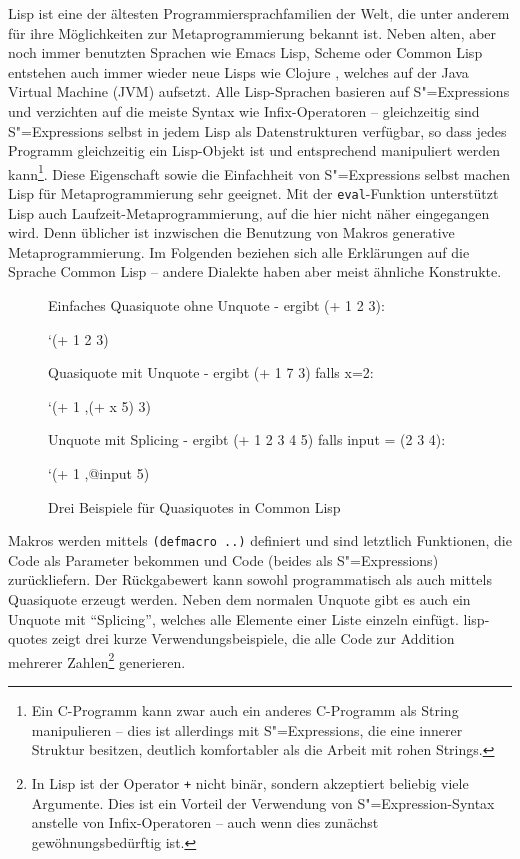 \documentclass[12pt, a4paper, bibgerm]{scrbook}
\newenvironment{DIFnomarkup}{}{}
\newcommand\icode[1]{\lstinline?#1?}
\newcommand\abb{}
\newcommand{\sexp}{S"=Expression}
\newcommand{\sexps}{S"=Expressions}
\begin{document}
Lisp ist eine der ältesten Programmiersprachfamilien der Welt, die unter
anderem für ihre Möglichkeiten zur Metaprogrammierung bekannt ist. Neben
alten, aber noch immer benutzten Sprachen wie Emacs Lisp, Scheme oder
Common Lisp entstehen auch immer wieder neue Lisps wie
Clojure \cite{Clojure}, welches auf der Java Virtual Machine (JVM)
aufsetzt. Alle Lisp-Sprachen basieren auf \sexps{} und verzichten auf
die meiste Syntax wie Infix-Operatoren -- gleichzeitig sind \sexps{}
selbst in jedem Lisp als Datenstrukturen verfügbar, so dass jedes
Programm gleichzeitig ein Lisp-Objekt ist und entsprechend manipuliert
werden kann\footnote{Ein C-Programm kann zwar auch ein anderes
  C-Programm als String manipulieren -- dies ist allerdings mit \sexps{},
  die eine innerer Struktur besitzen, deutlich komfortabler als die
  Arbeit mit rohen Strings.}. Diese Eigenschaft sowie die Einfachheit von
\sexps{} selbst machen Lisp für Metaprogrammierung sehr geeignet. Mit
der \icode{eval}-Funktion unterstützt Lisp auch
Laufzeit-Metaprogrammierung, auf die hier nicht näher eingegangen
wird. Denn üblicher ist inzwischen die Benutzung von Makros generative
Metaprogrammierung. Im Folgenden beziehen sich alle
Erklärungen auf die Sprache Common Lisp -- andere Dialekte haben aber
meist ähnliche Konstrukte.

\begin{figure}[h]
  \centering
  \begin{DIFnomarkup}\begin{code}
Einfaches Quasiquote ohne Unquote - ergibt (+ 1 2 3):

 `(+ 1 2 3)


Quasiquote mit Unquote - ergibt (+ 1 7 3) falls x=2:

`(+ 1 ,(+ x 5) 3)


Unquote mit Splicing - ergibt (+ 1 2 3 4 5) falls input = (2 3 4):

`(+ 1 ,@input 5)
  \end{code}\end{DIFnomarkup}
  \caption{Drei Beispiele für Quasiquotes in Common Lisp}
  \label{magicl:fig:lisp-quotes}
\end{figure}

Makros werden mittels \icode{(defmacro ..)} definiert und sind letztlich
Funktionen, die Code als Parameter bekommen und Code (beides als
\sexps{}) zurückliefern. Der Rückgabewert kann sowohl programmatisch als
auch mittels Quasiquote erzeugt werden. Neben dem normalen Unquote gibt
es auch ein Unquote mit "`Splicing"', welches alle Elemente einer Liste
einzeln einfügt. \abb{lisp-quotes} zeigt drei kurze
Verwendungsbeispiele, die alle Code zur Addition mehrerer
Zahlen\footnote{In Lisp ist der Operator \icode{+} nicht binär, sondern
  akzeptiert beliebig viele Argumente. Dies ist ein Vorteil der
  Verwendung von \sexp{}-Syntax anstelle von Infix-Operatoren -- auch
  wenn dies zunächst gewöhnungsbedürftig ist.} generieren.
\end{document}
